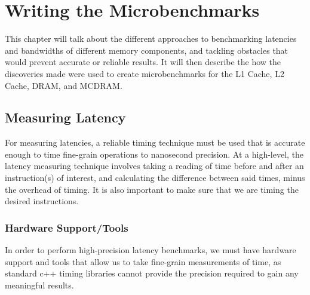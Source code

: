 \documentclass[bsc,frontabs,twoside,singlespacing,parskip,deptreport]{infthesis}     %
\begin{document}
\chapter{Writing the Microbenchmarks}\label{chap:writing-benchmarks}
This chapter will talk about the different approaches to benchmarking latencies and bandwidths of different memory components, and tackling obstacles that would prevent accurate or reliable results. It will then describe the how the discoveries made were used to create microbenchmarks for the L1 Cache, L2 Cache, DRAM, and MCDRAM.

\section{Measuring Latency}\label{measuring-latency}
For measuring latencies, a reliable timing technique must be used that is accurate enough to time fine-grain operations to nanosecond precision. At a high-level, the latency measuring technique involves taking a reading of time before and after an instruction(s) of interest, and calculating the difference between said times, minus the overhead of timing. It is also important to make sure that we are timing the desired instructions.

\subsection{Hardware Support/Tools}
In order to perform high-precision latency benchmarks, we must have hardware support and tools that allow us to take fine-grain measurements of time, as standard c++ timing libraries cannot provide the precision required to gain any meaningful results.
\end{document}
